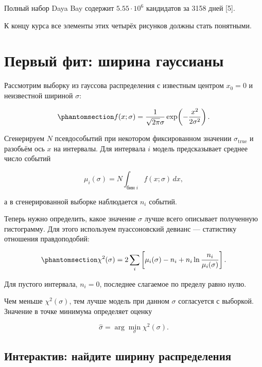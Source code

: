 \documentclass[
  russian,
  11pt,
  a4paper,
  open=any]{scrbook}
\begin{document}
Полный набор Daya Bay содержит \(5.55\cdot10^6\) кандидатов за 3158 дней
{[}5{]}.

К концу курса все элементы этих четырёх рисунков должны стать понятными.

\section{Первый фит: ширина
гауссианы}\label{ux43fux435ux440ux432ux44bux439-ux444ux438ux442-ux448ux438ux440ux438ux43dux430-ux433ux430ux443ux441ux441ux438ux430ux43dux44b}

Рассмотрим выборку из гауссова распределения с известным центром
\(x_0=0\) и неизвестной шириной \(\sigma\):

\begin{equation}\protect\phantomsection\label{eq-gaussian-width-model}{
f(x;\sigma)=
\frac{1}{\sqrt{2\pi}\sigma}
\exp\!\left(-\frac{x^2}{2\sigma^2}\right).
}\end{equation}

Сгенерируем \(N\) псевдособытий при некотором фиксированном значении
\(\sigma_{\mathrm{true}}\) и разобьём ось \(x\) на интервалы. Для
интервала \(i\) модель предсказывает среднее число событий

\[
\mu_i(\sigma)
=
N\int_{\text{бин }i} f(x;\sigma)\,dx,
\]

а в сгенерированной выборке наблюдается \(n_i\) событий.

Теперь нужно определить, какое значение \(\sigma\) лучше всего описывает
полученную гистограмму. Для этого используем пуассоновский девианс ---
статистику отношения правдоподобий:

\begin{equation}\protect\phantomsection\label{eq-poisson-deviance}{
\chi^2(\sigma)
=
2\sum_i
\left[
\mu_i(\sigma)-n_i
+n_i\ln\frac{n_i}{\mu_i(\sigma)}
\right].
}\end{equation}

Для пустого интервала, \(n_i=0\), последнее слагаемое по пределу равно
нулю.

Чем меньше \(\chi^2(\sigma)\), тем лучше модель при данном \(\sigma\)
согласуется с выборкой. Значение в точке минимума определяет оценку

\[
\widehat{\sigma}
=
\arg\min_\sigma \chi^2(\sigma).
\]

\subsection{Интерактив: найдите ширину
распределения}\label{interactive-first-fit}
\end{document}
